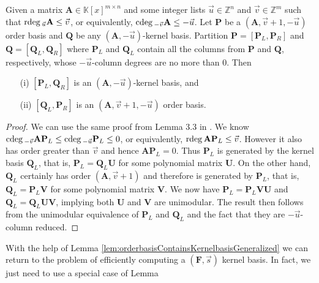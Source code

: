 \begin{lem}
\label{lem:orderbasisContainsKernelbasisGeneralized} Given a matrix
$\mathbf{A}\in\mathbb{K}\left[x\right]^{m\times n}$ and some integer
lists $\vec{u}\in\mathbb{Z}^{n}$ and $\vec{v}\in\mathbb{Z}^{m}$
such that ${\rm rdeg}\,_{\vec{u}}\mathbf{A}\le\vec{v}$, or equivalently,
${\rm cdeg}\,_{-\vec{v}}\mathbf{A}\le-\vec{u}$. Let $\mathbf{P}$ be a $\left(\mathbf{A},\vec{v}+1,-\vec{u}\right)$
order basis and $\mathbf{Q}$ be any $(\mathbf{A},-\vec{u})$-kernel
basis. Partition $\mathbf{P}=\left[\mathbf{P}_{L},\mathbf{P}_{R}\right]$
and $\mathbf{Q}=\left[\mathbf{Q}_{L},\mathbf{Q}_{R}\right]$ where
$\mathbf{P}_{L}$ and $\mathbf{Q}_{L}$ contain all the columns from
$\mathbf{P}$ and $\mathbf{Q}$, respectively, whose $-\vec{u}$-column
degrees are no more than $0$. Then 
\begin{itemize}
\item[(i)] $\left[\mathbf{P}_{L},\mathbf{Q}_{R}\right]$ is an $(\mathbf{A},-\vec{u})$-kernel
basis, and 
\item[(ii)] $\left[\mathbf{Q}_{L},\mathbf{P}_{R}\right]$ is an $\left(\mathbf{A},\vec{v}+1,-\vec{u}\right)$
order basis. 
\end{itemize}
\end{lem}
\begin{proof}
We can use the same proof from Lemma 3.3 in \cite{za2012}. We know
${\rm cdeg}\,_{-\vec{v}}\mathbf{A}\mathbf{P}_{L}\le{\rm cdeg}\,_{-\vec{u}}\mathbf{P}_{L}\le0$,
or equivalently, ${\rm rdeg}\,\mathbf{A}\mathbf{P}_{L}\le\vec{v}$. However
it also has order greater than $\vec{v}$ and hence $\mathbf{A}\mathbf{P}_{L}=0$.
Thus $\mathbf{P}_{L}$ is generated by the kernel basis $\mathbf{Q}_{L}$,
that is, $\mathbf{P}_{L}=\mathbf{Q}_{L}\mathbf{U}$ for some polynomial
matrix $\mathbf{U}$. On the other hand, $\mathbf{Q}_{L}$ certainly
has order $\left(\mathbf{A},\vec{v}+1\right)$ and therefore is generated
by $\mathbf{P}_{L}$, that is, $\mathbf{Q}_{L}=\mathbf{P}_{L}\mathbf{V}$
for some polynomial matrix $\mathbf{V}$. We now have $\mathbf{P}_{L}=\mathbf{P}_{L}\mathbf{V}\mathbf{U}$
and $\mathbf{Q}_{L}=\mathbf{Q}_{L}\mathbf{U}\mathbf{V}$, implying
both $\mathbf{U}$ and $\mathbf{V}$ are unimodular. The result then
follows from the unimodular equivalence of $\mathbf{P}_{L}$ and $\mathbf{Q}_{L}$
and the fact that they are $-\vec{u}$-column reduced.
\end{proof}
With the help of Lemma \ref{lem:orderbasisContainsKernelbasisGeneralized}
we can return to the problem of efficiently computing a $(\mathbf{F},\vec{s})$
kernel basis. In fact, we just need to use a special case of Lemma
